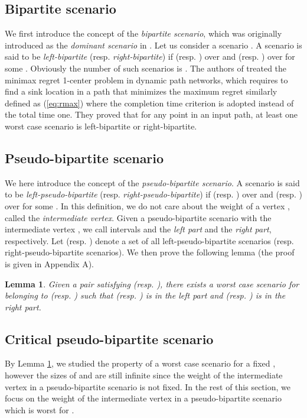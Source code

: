 \documentclass[a4paper]{llncs}
\newtheorem{lem}{Lemma}
\begin{document}
\subsection{Bipartite scenario}
\label{subsec:bs}
We first introduce the concept of the {\it bipartite scenario}, which was originally introduced as the {\it dominant scenario} in \cite{chknsx13,hacknsx14}.
Let us consider a scenario .
A scenario  is said to be {\it left-bipartite} (resp. {\it right-bipartite})
if  (resp. ) over  and 
 (resp. ) over  for some .
Obviously the number of such scenarios is .
The authors of \cite{chknsx13,hacknsx14} treated the minimax regret 1-center problem in dynamic path networks,
which requires to find a sink location in a path that minimizes the maximum regret similarly defined as (\ref{eq:rmax})
where the completion time criterion is adopted instead of the total time one.
They proved that for any point in an input path, at least one worst case scenario is left-bipartite or right-bipartite.


\subsection{Pseudo-bipartite scenario}
\label{subsec:pbs}
We here introduce the concept of the {\it pseudo-bipartite scenario}.
A scenario  is said to be {\it left-pseudo-bipartite} (resp. {\it right-pseudo-bipartite})
if  (resp. ) over  and 
 (resp. ) over  for some .
In this definition, we do not care about the weight of a vertex , called the {\it intermediate vertex}.
Given a pseudo-bipartite scenario with the intermediate vertex , we call intervals  and  the {\it left part} and the {\it right part}, respectively.
Let  (resp. ) denote a set of all left-pseudo-bipartite scenarios (resp. right-pseudo-bipartite scenarios).
We then prove the following lemma (the proof is given in Appendix A).
\begin{lem}
Given a pair  satisfying  (resp. ), there exists a worst case scenario for  belonging to  (resp. ) such that  (resp. ) is in the left part and  (resp. ) is in the right part.
\label{lem:wcsxy}
\end{lem}












\subsection{Critical pseudo-bipartite scenario}
\label{subsec:cpbs}
By Lemma \ref{lem:wcsxy}, we studied the property of a worst case scenario for a fixed ,
however 
the sizes of  and 
are still infinite since the weight of the intermediate vertex in a pseudo-bipartite scenario is not fixed.
In the rest of this section, we focus on the weight of the intermediate vertex in a pseudo-bipartite scenario
which is worst for .
\end{document}
